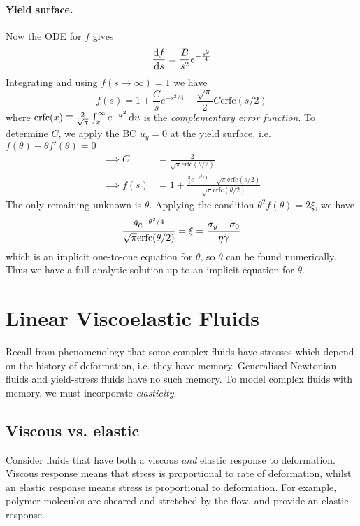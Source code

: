 \documentclass{jknotes}
\begin{document}
\paragraph{Yield surface.}
Now the ODE for $f$ gives
\begin{equation}
	\frac{\diffd f}{\diffd s} = \frac{B}{s^2} e^{-\frac{s^2}{4}}
\end{equation}
Integrating and using $f(s \to \infty) = 1$ we have
\begin{equation}
	f(s) = 1 + \frac{C}{s} e^{-s^2/4} - \frac{\sqrt{\pi}}{2}C
	\text{erfc}(s/2)
\end{equation}
where $\text{erfc}(x) \equiv \frac{2}{\sqrt{\pi}} \int_x^\infty e^{-u^2} \,
\diffd u$ is the \emph{complementary error function}. To determine $C$, we
apply the BC $u_y = 0$ at the yield surface, i.e. $f(\theta) + \theta
f'(\theta) = 0$
\begin{align}
	\implies C &= \frac{2}{\sqrt{\pi} \text{erfc}(\theta/2)} \\
	\implies f(s) &= 1 + \frac{\frac{2}{s} e^{-s^2/4} -
	\sqrt{\pi}\text{erfc}(s/2)}{\sqrt{\pi} \text{erfc}(\theta/2)}
\end{align}
The only remaining unknown is $\theta$. Applying the condition $\theta^2
f(\theta) = 2\xi$, we have
\begin{equation}
	\frac{\theta e^{-\theta^2/4}}{\sqrt{\pi}\text{erfc}(\theta/2)} = \xi =
	\frac{\sigma_y - \sigma_0}{\eta\dot{\gamma}}
\end{equation}
which is an implicit one-to-one equation for $\theta$, so $\theta$ can be
found numerically. Thus we have a full analytic solution up to an implicit
equation for $\theta$.

\section{Linear Viscoelastic Fluids}
Recall from phenomenology that some complex fluids have stresses which depend
on the history of deformation, i.e. they have memory. Generalised Newtonian
fluids and yield-stress fluids have no such memory. To model complex fluids
with memory, we must incorporate \emph{elasticity}.

\subsection{Viscous vs. elastic}
Consider fluids that have both a viscous \emph{and} elastic response to
deformation. Viscous response means that stress is proportional to rate of
deformation, whilst an elastic response means stress is proportional to
deformation. For example, polymer molecules are sheared and stretched by the
flow, and provide an elastic response.
\end{document}

